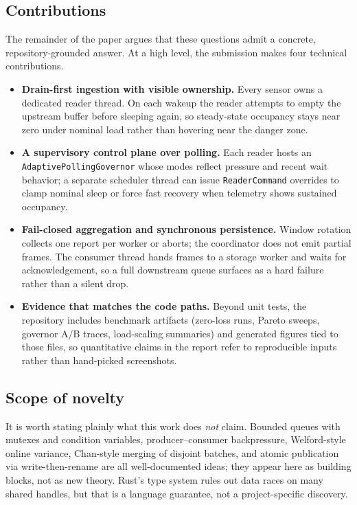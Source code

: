 \documentclass[11pt]{article}
\begin{document}
\subsection*{Contributions}
The remainder of the paper argues that these questions admit a concrete, repository-grounded answer. At a high level, the submission makes four technical contributions.
\begin{itemize}
\item \textbf{Drain-first ingestion with visible ownership.} Every sensor owns a dedicated reader thread. On each wakeup the reader attempts to empty the upstream buffer before sleeping again, so steady-state occupancy stays near zero under nominal load rather than hovering near the danger zone.
\item \textbf{A supervisory control plane over polling.} Each reader hosts an \texttt{AdaptivePollingGovernor} whose modes reflect pressure and recent wait behavior; a separate scheduler thread can issue \texttt{ReaderCommand} overrides to clamp nominal sleep or force fast recovery when telemetry shows sustained occupancy.
\item \textbf{Fail-closed aggregation and synchronous persistence.} Window rotation collects one report per worker or aborts; the coordinator does not emit partial frames. The consumer thread hands frames to a storage worker and waits for acknowledgement, so a full downstream queue surfaces as a hard failure rather than a silent drop.
\item \textbf{Evidence that matches the code paths.} Beyond unit tests, the repository includes benchmark artifacts (zero-loss runs, Pareto sweeps, governor A/B traces, load-scaling summaries) and generated figures tied to those files, so quantitative claims in the report refer to reproducible inputs rather than hand-picked screenshots.
\end{itemize}

\subsection*{Scope of novelty}
It is worth stating plainly what this work does \emph{not} claim. Bounded queues with mutexes and condition variables, producer--consumer backpressure, Welford-style online variance, Chan-style merging of disjoint batches, and atomic publication via write-then-rename are all well-documented ideas; they appear here as building blocks, not as new theory. Rust's type system rules out data races on many shared handles, but that is a language guarantee, not a project-specific discovery.
\end{document}
